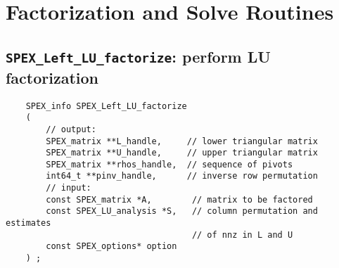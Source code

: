 \documentclass[12pt]{report}
\theoremstyle{definition}
\begin{document}
\newpage




\section{Factorization and Solve Routines}

\cprotect\subsection{\verb|SPEX_Left_LU_factorize|: perform LU factorization}
\label{s:LeftLU:SPEX_Left_LU_factorize}

\begin{mdframed}[userdefinedwidth=6in]
{\footnotesize
\begin{verbatim}
    SPEX_info SPEX_Left_LU_factorize
    (
        // output:
        SPEX_matrix **L_handle,     // lower triangular matrix
        SPEX_matrix **U_handle,     // upper triangular matrix
        SPEX_matrix **rhos_handle,  // sequence of pivots
        int64_t **pinv_handle,      // inverse row permutation
        // input:
        const SPEX_matrix *A,        // matrix to be factored
        const SPEX_LU_analysis *S,   // column permutation and estimates
                                     // of nnz in L and U 
        const SPEX_options* option
    ) ;
\end{verbatim}
} \end{mdframed}
\end{document}
